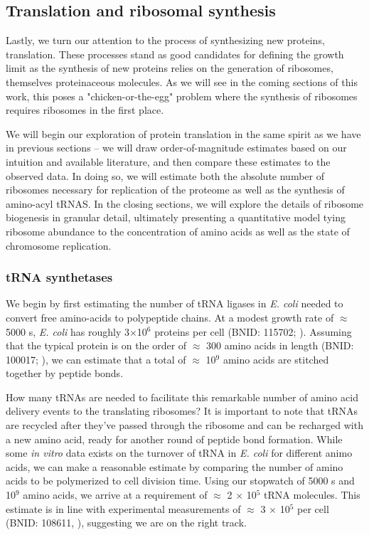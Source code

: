 \subsection{Translation and ribosomal synthesis}
Lastly, we turn our attention to the process of synthesizing new proteins,
translation. These processes stand as good candidates for defining the growth
limit as the synthesis of new proteins relies on the generation of ribosomes,
themselves proteinaceous molecules. As we will see in the coming sections of
this work, this poses a "chicken-or-the-egg" problem where the synthesis of
ribosomes requires ribosomes in the first place.

We will begin our exploration of protein translation in the same spirit as we
have in previous sections -- we will draw order-of-magnitude estimates based on
our intuition and available literature, and then compare these estimates
to the observed data. In doing so, we will estimate both the absolute number of
ribosomes necessary for replication of the proteome as well as the synthesis of
amino-acyl tRNAS. In the closing sections, we will explore the details of
ribosome biogenesis in granular detail, ultimately presenting a quantitative
model tying ribosome abundance to the concentration of amino acids as well as
the state of chromosome replication.

\subsubsection{tRNA synthetases}
We begin by first estimating the number of tRNA ligases in \textit{E. coli}
needed to convert free amino-acids to polypeptide chains. At a modest growth
rate of $\approx$ 5000 s, \textit{E. coli} has roughly 3$\times$10$^6$ proteins
per cell (BNID: 115702; \cite{milo2010}). Assuming that the typical protein is
on the order of $\approx$ 300 amino acids in length (BNID: 100017;
\cite{milo2010}), we can estimate that a total of $\approx$ 10$^9$ amino acids
are stitched together by peptide bonds.

How many tRNAs are needed to facilitate this remarkable number of amino acid
delivery events to the translating ribosomes? It is important to note that tRNAs
are recycled after they've passed through the ribosome and can be recharged with
a new amino acid, ready for another round of peptide bond formation. While some
\textit{in vitro} data exists on  the turnover of tRNA in \textit{E. coli} for
different  animo acids, we can make a reasonable estimate by comparing the
number of amino acids to be  polymerized to cell division time. Using our
stopwatch of 5000 s and 10$^9$ amino acids, we arrive at a requirement of
$\approx$ 2 $\times$ 10$^5$ tRNA molecules. This estimate is in line with
experimental measurements of $\approx$ 3 $\times$ 10$^5$ per cell (BNID: 108611,
\cite{milo2010}), suggesting we are on the right track.

